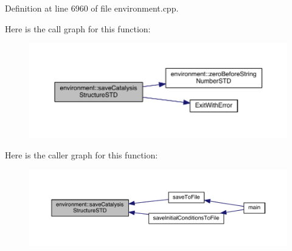 Definition at line 6960 of file environment.\-cpp.



Here is the call graph for this function\-:
\nopagebreak
\begin{figure}[H]
\begin{center}
\leavevmode
\includegraphics[width=350pt]{a00014_a0a799b3a42bd90845a915298e184708c_cgraph}
\end{center}
\end{figure}




Here is the caller graph for this function\-:
\nopagebreak
\begin{figure}[H]
\begin{center}
\leavevmode
\includegraphics[width=350pt]{a00014_a0a799b3a42bd90845a915298e184708c_icgraph}
\end{center}
\end{figure}


